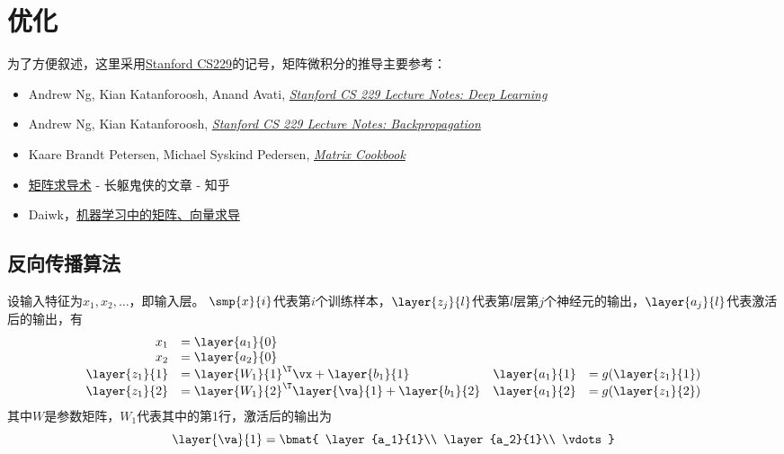
\section{优化} %
为了方便叙述，这里采用\href{http://cs229.stanford.edu/notes2019fall/cs229-notes-deep_learning.pdf}{Stanford CS229}的记号，矩阵微积分的推导主要参考：
\begin{itemize}
    \item Andrew Ng, Kian Katanforoosh, Anand Avati, \href{http://cs229.stanford.edu/notes2019fall/cs229-notes-deep_learning.pdf}{\emph{Stanford CS 229 Lecture Notes: Deep Learning}}
    \item Andrew Ng, Kian Katanforoosh, \href{http://cs229.stanford.edu/notes/cs229-notes-backprop.pdf}{\emph{Stanford CS 229 Lecture Notes: Backpropagation}}
    \item Kaare Brandt Petersen, Michael Syskind Pedersen, \href{https://www.math.uwaterloo.ca/~hwolkowi/matrixcookbook.pdf}{\emph{Matrix Cookbook}}
    \item \href{https://zhuanlan.zhihu.com/p/24709748}{矩阵求导术} - 长躯鬼侠的文章 - 知乎
    \item Daiwk，\href{https://daiwk.github.io/assets/matrix+vector+derivatives+for+machine+learning.pdf}{机器学习中的矩阵、向量求导}
\end{itemize}

\subsection{反向传播算法}
设输入特征为$x_1,x_2,\ldots$，即输入层。
$\smp{x}{i}$代表第$i$个训练样本，$\layer{z_j}{l}$代表第$l$层第$j$个神经元的输出，$\layer{a_j}{l}$代表激活后的输出，有
\[\begin{array}{rlrl}
x_1 &= \layer{a_1}{0} & & \\
x_2 &= \layer{a_2}{0} & & \\
\layer{z_1}{1}&=\layer{W_1}{1}^\T\vx+\layer{b_1}{1} &
\layer{a_1}{1}&=g(\layer{z_1}{1})\\
\layer{z_1}{2}&=\layer{W_1}{2}^\T\layer{\va}{1}+\layer{b_1}{2} &
\layer{a_1}{2}&=g(\layer{z_1}{2})
\end{array}\]
其中$W$是参数矩阵，$W_1$代表其中的第1行，激活后的输出为
\[\layer{\va}{1}=\bmat{
    \layer{a_1}{1}\\
    \layer{a_2}{1}\\
    \vdots
}\]

